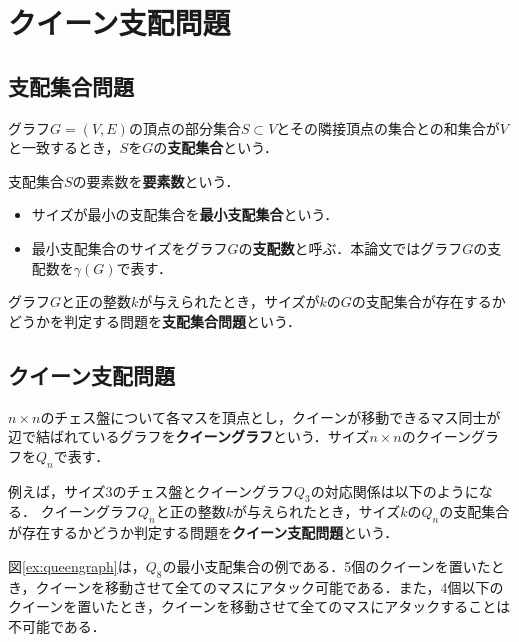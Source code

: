\chapter{クイーン支配問題}\label{chap:background}

\section{支配集合問題}
グラフ$G=(V,E)$の頂点の部分集合$S\subset V$とその隣接頂点の集合との和集合が$V$と一致するとき，$S$を$G$の\textbf{支配集合}という．\par
支配集合$S$の要素数を\textbf{要素数}という．
 \begin{itemize}
  \item サイズが最小の支配集合を\textbf{最小支配集合}という．
  \item 最小支配集合のサイズをグラフ$G$の\textbf{支配数}と呼ぶ．本論文ではグラフ$G$の支配数を$\gamma(G)$で表す．
 \end{itemize}
  グラフ$G$と正の整数$k$が与えられたとき，サイズが$k$の$G$の支配集合が存在するかどうかを判定する問題を\textbf{支配集合問題}という．
\section{クイーン支配問題}
$n\times n$のチェス盤について各マスを頂点とし，クイーンが移動できるマス同士が辺で結ばれているグラフを\textbf{クイーングラフ}という．サイズ$n\times n$のクイーングラフを$Q_n$で表す．\par
例えば，サイズ3のチェス盤とクイーングラフ$Q_3$の対応関係は以下のようになる．
クイーングラフ$Q_n$と正の整数$k$が与えられたとき，サイズ$k$の$Q_n$の支配集合が存在するかどうか判定する問題を\textbf{クイーン支配問題}という．\par
図\ref{ex:queengraph}は，$Q_8$の最小支配集合の例である．5個のクイーンを置いたとき，クイーンを移動させて全てのマスにアタック可能である．また，4個以下のクイーンを置いたとき，クイーンを移動させて全てのマスにアタックすることは不可能である．




